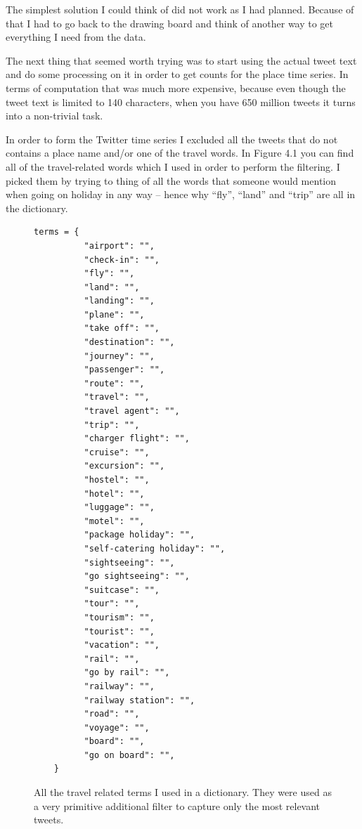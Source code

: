 \documentclass[minf,twoside,singlespacing,parskip,frontabs,notimes,11pt]{infthesis}
\begin{document}
The simplest solution I could think of did not work as I had planned. Because of that I had to go back to the drawing board and think of another way to get everything I need from the data. 


The next thing that seemed worth trying was to start using the actual tweet text and do some processing on it in order to get counts for the place time series. In terms of computation that was much more expensive, because even though the tweet text is limited to 140 characters, when you have 650 million tweets it turns into a non-trivial task. 

In order to form the Twitter time series I excluded all the tweets that do not contains a place name and/or one of the travel words. In Figure 4.1 you can find all of the travel-related words which I used in order to perform the filtering. I picked them by trying to thing of all the words that someone would mention when going on holiday in any way -- hence why ``fly'', ``land'' and ``trip'' are all in the dictionary. 


\begin{figure}[]
\begin{center}
\begin{lstlisting}
terms = {
          "airport": "",
          "check-in": "",
          "fly": "",
          "land": "",
          "landing": "",
          "plane": "",
          "take off": "",
          "destination": "",
          "journey": "",
          "passenger": "",
          "route": "",
          "travel": "",
          "travel agent": "",
          "trip": "",
          "charger flight": "",
          "cruise": "",
          "excursion": "",
          "hostel": "",
          "hotel": "",
          "luggage": "",
          "motel": "",
          "package holiday": "",
          "self-catering holiday": "",
          "sightseeing": "",
          "go sightseeing": "",
          "suitcase": "",
          "tour": "",
          "tourism": "",
          "tourist": "",
          "vacation": "",
          "rail": "",
          "go by rail": "",
          "railway": "",
          "railway station": "",
          "road": "",
          "voyage": "",
          "board": "",
          "go on board": "",
	}
\end{lstlisting}
\end{center}
\caption{All the travel related terms I used in a dictionary. They were used as a very primitive additional filter to capture only the most relevant tweets. }
\end{figure}
\end{document}
